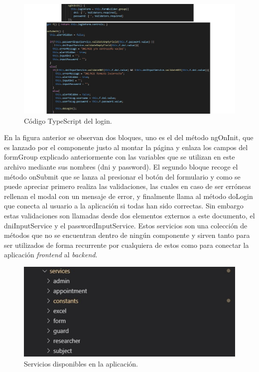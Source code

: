     \begin{figure}[h]
    \centering
     \includegraphics[width=1\textwidth]{images/loginTS.jpg}
    \caption{Código TypeScript del login.}
    \end{figure}
    \FloatBarrier
    
    En la figura anterior se observan dos bloques, uno es el del método ngOnInit, que es lanzado por el componente justo al montar la página y enlaza los campos del formGroup explicado anteriormente con las variables que se utilizan en este archivo mediante sus nombres (dni y password). El segundo bloque recoge el método onSubmit que se lanza al presionar el botón del formulario y como se puede apreciar primero realiza las validaciones, las cuales en caso de ser erróneas rellenan el modal con un mensaje de error, y finalmente llama al método doLogin que conecta al usuario a la aplicación si todas han sido correctas. Sin embargo estas validaciones son llamadas desde dos elementos externos a este documento, el dniInputService y el passwordInputService. Estos servicios son una colección de métodos que no se encuentran dentro de ningún componente y  sirven tanto para ser utilizados de forma recurrente por cualquiera de estos como para conectar la aplicación \textit{frontend} al \textit{backend}.
    
    \begin{figure}[h]
    \centering
     \includegraphics[width=1\textwidth]{images/services.jpg}
    \caption{Servicios disponibles en la aplicación.}
    \end{figure}
    \FloatBarrier
    
